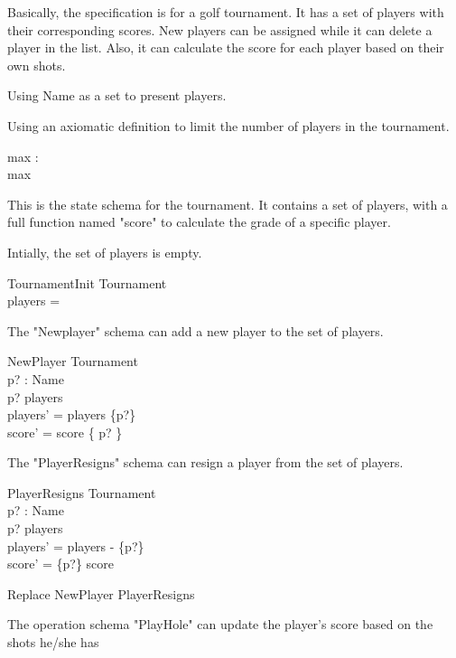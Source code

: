 \documentclass{llncs}
\begin{document}
Basically, the specification is for a golf tournament. It has a set of players with their corresponding 
scores. New players can be assigned while it can delete a player in the list. Also, it can calculate 
the score for each player based on their own shots.


Using Name as a set to present players.
\begin{zed}
[Name]
\end{zed}
Using an axiomatic definition to limit the number of players in the tournament.
\begin{axdef}
max : \nat \\
\ST max 
\end{axdef}
This is the state schema for the tournament. It contains a set of players, with a full function 
named "score" to calculate the grade of a specific player.

Intially, the set of players is empty.
\begin{schema}{TournamentInit}
Tournament \\
\ST players = \emptyset
\end{schema}

The "Newplayer" schema can add a new player to the set of players.
\begin{schema}{NewPlayer}
\Delta Tournament \\
p? : Name \\
\ST p? \notin players \\
players' = players \cup \{p?\} \\
score' = score \cup \{ p?  \}
\end{schema}

The "PlayerResigns" schema can resign a player from the set of players.
\begin{schema}{PlayerResigns}
\Delta Tournament \\
p? : Name\\
\ST p? \in players\\
players' = players - \{p?\} \\
score' = \{p?\} \dsub score
\end{schema}


\begin{zed}
Replace  NewPlayer \zcmp PlayerResigns
\end{zed}

The operation schema "PlayHole" can update the player's score based on the shots he/she has
\end{document}
